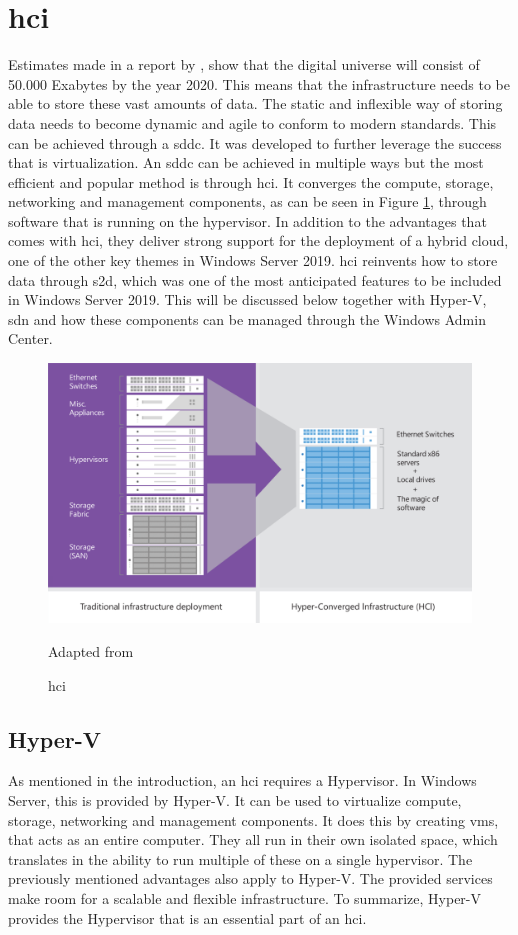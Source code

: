 \section{\acrfull{hci}}
Estimates made in a report by \textcite{Gantz2012}, show that the digital universe will consist of 50.000 Exabytes by the year 2020. This means that the infrastructure needs to be able to store these vast amounts of data. The static and inflexible way of storing data needs to become dynamic and agile to conform to modern standards. This can be achieved through a \acrfull{sddc}. It was developed to further leverage the success that is virtualization. An \acrshort{sddc} can be achieved in multiple ways but the most efficient and popular method is through \acrshort{hci}. It converges the compute, storage, networking and management components, as can be seen in Figure \ref{fig:HCI}, through software that is running on the hypervisor. In addition to the advantages that comes with \acrshort{hci}, they deliver strong support for the deployment of a hybrid cloud, one of the other key themes in Windows Server 2019. 
\acrshort{hci} reinvents how to store data through \acrshort{s2d}, which was one of the most anticipated features to be included in Windows Server 2019. This will be discussed below together with Hyper-V, \acrshort{sdn} and how these components can be managed through the Windows Admin Center. \autocite{Haag2016}
\begin{figure}[h]
	\includegraphics[width=0.8\linewidth]{img/HCI.png}
	\captionsetup{width=0.6\linewidth}
	\centering		
	\caption{\acrshort{hci}}
	\scriptsize	
	Adapted from \cite{Woolslayer2018}
	\label{fig:HCI}
\end{figure}

\subsection{Hyper-V}
As mentioned in the introduction, an \acrshort{hci} requires a Hypervisor. In Windows Server, this is provided by Hyper-V. It can be used to virtualize compute, storage, networking and management components.  It does this by creating \acrshort{vm}s, that acts as an entire computer. They all run in their own isolated space, which translates in the ability to run multiple of these on a single hypervisor. The previously mentioned advantages also apply to Hyper-V. The provided services make room for a scalable and flexible infrastructure. To summarize, Hyper-V provides the Hypervisor that is an essential part of an \acrshort{hci}. \autocite{Short2016}
